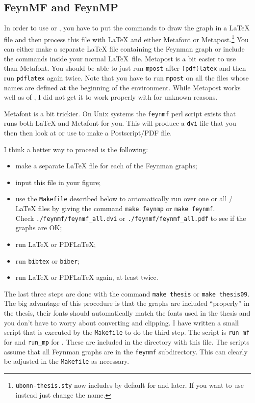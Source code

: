 \subsection{FeynMF and FeynMP}
\label{sec:fig:feynman:feynmf}

In order to use  or , you have to put
the commands to draw the graph in a \LaTeX{} file and then process
this file with \LaTeX{} and either Metafont or
Metapost.\footnote{\texttt{ubonn-thesis.sty} now includes 
  by default for  and later. If you want to use
   instead just change the name.}  You can either make
a separate \LaTeX{} file containing the Feynman graph or include the
commands inside your normal \LaTeX\ file.  Metapost is
a bit easier to use than Metafont.  You should be able to just run
\texttt{mpost} after \texttt{(pdf)latex} and then run
\texttt{pdflatex} again twice. Note that you have to run
\texttt{mpost} on all the files whose names are defined at the
beginning of the  environment. While Metapost works well
as of , I did not get it to work properly with  for unknown reasons.

Metafont is a bit trickier. On Unix systems the
\texttt{feynmf} perl script exists that runs both \LaTeX{} and
Metafont for you. This will produce a \texttt{dvi} file that you then
then look at or use to make a Postscript/PDF file.

I think a better way to proceed is the following:
\begin{itemize}
\item make a separate \LaTeX{} file for each of the Feynman graphs;
\item input this file in your figure;
\item use the \texttt{Makefile} described below to automatically run
  over one or all / \LaTeX{} files by giving the
  command \texttt{make feynmp} or \texttt{make feynmf}.\\
  Check
  \texttt{./feynmf/feynmf\_all.dvi} or
  \texttt{./feynmf/feynmf\_all.pdf} to see if the graphs are OK;
\item run \LaTeX{} or PDF\LaTeX;
\item run \texttt{bibtex} or \texttt{biber};
\item run \LaTeX{} or PDF\LaTeX{} again, at least twice.
\end{itemize}
The last three steps are done with the command \texttt{make thesis} or
\texttt{make thesis09}.
The big advantage of this procedure is that the graphs are included
\enquote{properly} in the thesis, their fonts should automatically
match the fonts used in the thesis and you don't have to worry about
converting and clipping. I have written a small script that is
executed by the \texttt{Makefile} to do the third step.
The script is \texttt{run\_mf} for  and
\texttt{run\_mp} for . These are
included in the directory with this file.
The scripts assume that all Feynman
graphs are in the \texttt{feynmf} subdirectory. This can clearly be
adjusted in the \texttt{Makefile} as necessary.


